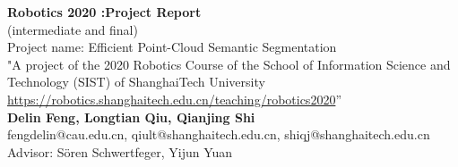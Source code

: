 \documentclass{article}
\begin{document}
	\begin{center}
    
    
		\LARGE{\textbf{Robotics 2020 :Project Report}} \\
		(intermediate and final)\\
        \vspace{1em}
        \Large{Project name:  Efficient Point-Cloud Semantic Segmentation} \\
        \small{"A project of the 2020 Robotics Course of the School of Information Science and Technology (SIST) of ShanghaiTech University \\ 
        \url{https://robotics.shanghaitech.edu.cn/teaching/robotics2020}”}\\
        \vspace{1em}
        \normalsize\textbf{Delin Feng, Longtian Qiu, Qianjing Shi} \\
        \normalsize{fengdelin@cau.edu.cn, qiult@shanghaitech.edu.cn, shiqj@shanghaitech.edu.cn} \\
        \vspace{1em}
        \normalsize{Advisor: Sören Schwertfeger, Yijun Yuan} \\
        \vspace{1em}
     
	\end{center}
\end{document}
